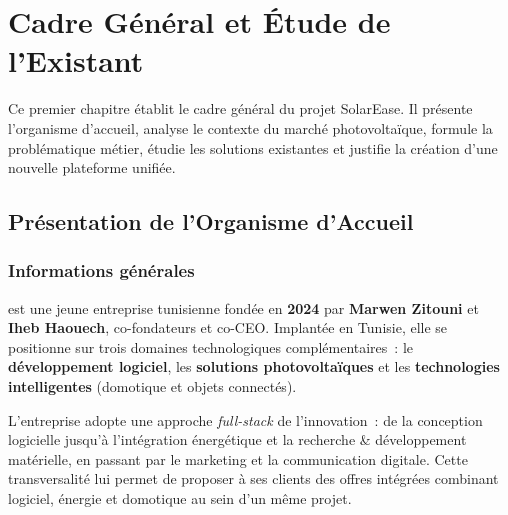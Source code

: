 \chapter{Cadre Général et Étude de l'Existant}

\begin{chapterintro}
  Ce premier chapitre établit le cadre général du projet SolarEase. Il présente
  l'organisme d'accueil, analyse le contexte du marché photovoltaïque, formule
  la problématique métier, étudie les solutions existantes et justifie la
  création d'une nouvelle plateforme unifiée.
\end{chapterintro}

\section{Présentation de l'Organisme d'Accueil}

\subsection{Informations générales}

\textbf{\organisme} est une jeune entreprise tunisienne fondée en
\textbf{2024} par \textbf{Marwen Zitouni} et \textbf{Iheb Haouech},
co-fondateurs et co-CEO. Implantée en Tunisie, elle se positionne sur trois
domaines technologiques complémentaires~: le \textbf{développement
logiciel}, les \textbf{solutions photovoltaïques} et les
\textbf{technologies intelligentes} (domotique et objets connectés).

L'entreprise adopte une approche \textit{full-stack} de l'innovation~:
de la conception logicielle jusqu'à l'intégration énergétique et la
recherche \& développement matérielle, en passant par le marketing
et la communication digitale. Cette transversalité lui permet de proposer
à ses clients des offres intégrées combinant logiciel, énergie et
domotique au sein d'un même projet.

